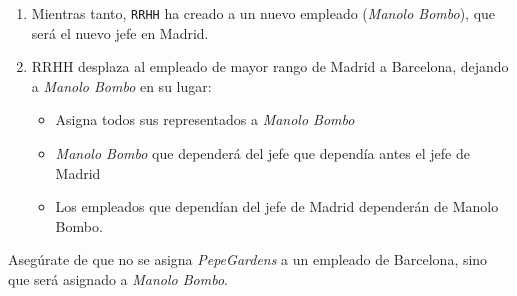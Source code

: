 \begin{homeworkProblem}

  
\end{homeworkProblem}





\begin{homeworkProblem}

  {

    \begin{enumerate}
    \item Mientras tanto, \texttt{RRHH} ha creado a un nuevo empleado (\textit{Manolo Bombo}), que será el nuevo jefe en Madrid.
    \item RRHH desplaza al empleado de mayor rango de Madrid a Barcelona, dejando a \textit{Manolo Bombo} en su lugar:
      \begin{itemize}
      \item Asigna todos sus representados a \textit{Manolo Bombo}
      \item \textit{Manolo Bombo} que dependerá del jefe que dependía antes el jefe de Madrid
      \item Los empleados que dependían del jefe de Madrid dependerán de Manolo Bombo.
      \end{itemize}
    \end{enumerate}
    }
  Asegúrate de que no se asigna \textit{PepeGardens} a un empleado de Barcelona, sino que será asignado a \textit{Manolo Bombo}.


\end{homeworkProblem}
